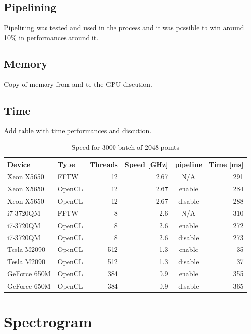    \subsection{Pipelining}

	Pipelining was tested and used in the process and it was possible to win around 10\% in performances around it.

   \subsection{Memory}

	Copy of memory from and to the GPU discution.

   \subsection{Time}

	Add table with time performances and discution.

	\begin{table}[H]
		\caption{Speed for 3000 batch of 2048 points}
		\begin{tabular}{|l|lrrcr|}
			\hline
				Device & Type & Threads & Speed [GHz] & pipeline & Time [ms] \\
			\hline
			\hline
				Xeon X5650 & FFTW & 12 & 2.67 & N/A & 291 \\
				Xeon X5650 & OpenCL & 12 & 2.67 & enable & 284 \\
				Xeon X5650 & OpenCL & 12 & 2.67 & disable & 288 \\
			\hline
				i7-3720QM & FFTW & 8 & 2.6 & N/A & 310 \\
				i7-3720QM & OpenCL & 8 & 2.6 & enable & 272 \\
				i7-3720QM & OpenCL & 8 & 2.6 & disable & 273 \\
			\hline
			\hline
				Tesla M2090 & OpenCL & 512 & 1.3 & enable & 35 \\
				Tesla M2090 & OpenCL & 512 & 1.3 & disable & 37 \\
			\hline
				GeForce 650M & OpenCL & 384 & 0.9 & enable & 355 \\
				GeForce 650M & OpenCL & 384 & 0.9 & disable & 365 \\
			\hline
		\end{tabular}
	\end{table}

\section{Spectrogram}
\label{sec:spectrogram}

